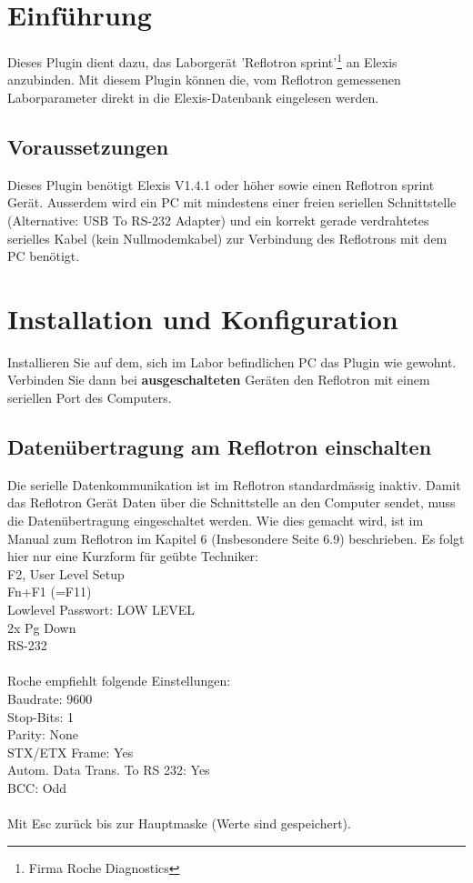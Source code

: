 \documentclass[a4paper]{scrartcl}
\begin{document}
\section{Einf\"uhrung}
Dieses Plugin dient dazu, das Laborger\"at 'Reflotron sprint'\footnote{Firma Roche Diagnostics} an Elexis anzubinden. Mit diesem Plugin k\"onnen die, vom Reflotron gemessenen Laborparameter direkt in die Elexis-Datenbank eingelesen werden.

\subsection{Voraussetzungen}
Dieses Plugin ben\"otigt Elexis V1.4.1 oder h\"oher sowie einen Reflotron sprint Ger\"at. Ausserdem wird ein PC mit mindestens einer freien seriellen Schnittstelle (Alternative: USB To RS-232 Adapter) und ein korrekt gerade verdrahtetes serielles Kabel (kein Nullmodemkabel) zur Verbindung des Reflotrons mit dem PC ben\"otigt.

\section{Installation und Konfiguration}
Installieren Sie auf dem, sich im Labor befindlichen PC das Plugin wie gewohnt. Verbinden Sie dann bei \textbf{ausgeschalteten} Ger\"aten den Reflotron mit einem seriellen Port des Computers. 
\subsection{Daten\"ubertragung am Reflotron einschalten}
Die serielle Datenkommunikation ist im Reflotron standardm\"assig inaktiv. Damit das Reflotron Ger\"at Daten \"uber die Schnittstelle an den Computer sendet, muss die Daten\"ubertragung eingeschaltet werden. Wie dies gemacht wird, ist im Manual zum Reflotron im Kapitel 6 (Insbesondere Seite 6.9) beschrieben. Es folgt hier nur eine Kurzform f\"ur ge\"ubte Techniker:\\
F2, User Level Setup\\
Fn+F1 (=F11)\\
Lowlevel Passwort: LOW LEVEL\\
2x Pg Down\\
RS-232\\
\\
Roche empfiehlt folgende Einstellungen:\\
Baudrate: 9600\\
Stop-Bits: 1\\
Parity: None\\
STX/ETX Frame: Yes\\
Autom. Data Trans. To RS 232: Yes\\
BCC: Odd\\
\\
Mit Esc zur\"uck bis zur Hauptmaske (Werte sind gespeichert).
\end{document}
